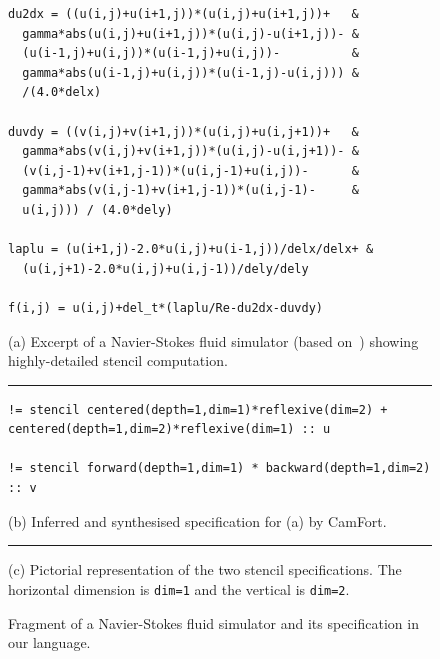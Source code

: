 \documentclass[9pt,preprint]{sigplanconf}
\theoremstyle{definition}
\begin{document}
\begin{figure}[t]
\begin{verbatim}
du2dx = ((u(i,j)+u(i+1,j))*(u(i,j)+u(i+1,j))+   &
  gamma*abs(u(i,j)+u(i+1,j))*(u(i,j)-u(i+1,j))- &
  (u(i-1,j)+u(i,j))*(u(i-1,j)+u(i,j))-          &
  gamma*abs(u(i-1,j)+u(i,j))*(u(i-1,j)-u(i,j))) &
  /(4.0*delx)

duvdy = ((v(i,j)+v(i+1,j))*(u(i,j)+u(i,j+1))+   &
  gamma*abs(v(i,j)+v(i+1,j))*(u(i,j)-u(i,j+1))- &
  (v(i,j-1)+v(i+1,j-1))*(u(i,j-1)+u(i,j))-      &
  gamma*abs(v(i,j-1)+v(i+1,j-1))*(u(i,j-1)-     & 
  u(i,j))) / (4.0*dely)

laplu = (u(i+1,j)-2.0*u(i,j)+u(i-1,j))/delx/delx+ &
  (u(i,j+1)-2.0*u(i,j)+u(i,j-1))/dely/dely

f(i,j) = u(i,j)+del_t*(laplu/Re-du2dx-duvdy)
\end{verbatim}
(a) Excerpt of a Navier-Stokes fluid simulator
(based on~\citet{griebel1997numerical}) showing highly-detailed stencil computation.
\vspace{0.5em}
\hrule
%
\begin{verbatim}
!= stencil centered(depth=1,dim=1)*reflexive(dim=2) + centered(depth=1,dim=2)*reflexive(dim=1) :: u

!= stencil forward(depth=1,dim=1) * backward(depth=1,dim=2) :: v
\end{verbatim}
(b) Inferred and synthesised specification for (a) by CamFort.
\vspace{0.5em}
\hrule
%
\begin{center}
\end{center}
\vspace{-0.5em}
(c) Pictorial representation of the two stencil specifications.
The horizontal dimension is \texttt{dim=1} and the vertical is \texttt{dim=2}.
\caption{Fragment of a Navier-Stokes fluid simulator and its
  specification in our language.}
\label{ref:navier-stokes-fragment}
\vspace{-0.8em}
\end{figure}
\end{document}
